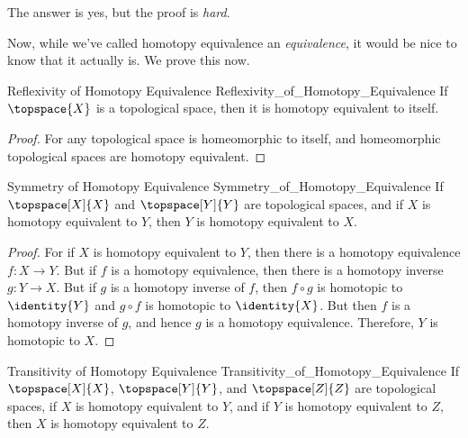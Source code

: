 \documentclass{book}                                                           %
\begin{document}
                The answer is yes, but the proof is \textit{hard}.
                \par\hfill\par
                Now, while we've called homotopy equivalence an
                \textit{equivalence}, it would be nice to know that it actually
                is. We prove this now.
                \begin{ltheorem}{Reflexivity of Homotopy Equivalence}
                                {Reflexivity_of_Homotopy_Equivalence}
                    If $\topspace{X}$ is a topological space, then it is
                    homotopy equivalent to itself.
                \end{ltheorem}
                \begin{proof}
                    For any topological space is homeomorphic to itself, and
                    homeomorphic topological spaces are homotopy equivalent.
                \end{proof}
                \begin{ltheorem}{Symmetry of Homotopy Equivalence}
                                {Symmetry_of_Homotopy_Equivalence}
                    If $\topspace[X]{X}$ and $\topspace[Y]{Y}$ are topological
                    spaces, and if $X$ is homotopy equivalent to $Y$, then
                    $Y$ is homotopy equivalent to $X$.
                \end{ltheorem}
                \begin{proof}
                    For if $X$ is homotopy equivalent to $Y$, then there is a
                    homotopy equivalence $f:X\rightarrow{Y}$. But if $f$ is a
                    homotopy equivalence, then there is a homotopy inverse
                    $g:Y\rightarrow{X}$. But if $g$ is a homotopy inverse of
                    $f$, then $f\circ{g}$ is homotopic to $\identity{Y}$ and
                    $g\circ{f}$ is homotopic to $\identity{X}$. But then $f$ is
                    a homotopy inverse of $g$, and hence $g$ is a homotopy
                    equivalence. Therefore, $Y$ is homotopic to $X$.
                \end{proof}
                \begin{ltheorem}{Transitivity of Homotopy Equivalence}
                                {Transitivity_of_Homotopy_Equivalence}
                    If $\topspace[X]{X}$, $\topspace[Y]{Y}$, and
                    $\topspace[Z]{Z}$ are topological spaces, if $X$ is homotopy
                    equivalent to $Y$, and if $Y$ is homotopy equivalent to $Z$,
                    then $X$ is homotopy equivalent to $Z$.
                \end{ltheorem}
\end{document}
